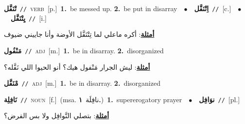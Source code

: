 \documentclass[10pt,a4paper,twoside]{article} %
\begin{document}
\begin{multicols}{2}
{\setlength\topsep{0pt}\textbf{\foreignlanguage{arabic}{تْنَفَّل}}\ {\color{gray}\texttt{//}\color{black}}\ \textsc{verb}\ [p.]\ \textbf{1.}~be messed up.  \textbf{2.}~be put in disarray\ \ $\bullet$\ \ \setlength\topsep{0pt}\textbf{\foreignlanguage{arabic}{اِتْنَفَّل}}\ {\color{gray}\texttt{//}\color{black}}\ [c.]\ \ $\bullet$\ \ \setlength\topsep{0pt}\textbf{\foreignlanguage{arabic}{يِتْنَفَّل}}\ {\color{gray}\texttt{//}\color{black}}\ [i.]\  \begin{flushright}\color{gray}\foreignlanguage{arabic}{\textbf{\underline{\foreignlanguage{arabic}{أمثلة}}}: أكره ماعلي لما تِتْنَفَّل الأوضة وأنا جاييني ضيوف}\end{flushright}\color{black}} \vspace{2mm}

{\setlength\topsep{0pt}\textbf{\foreignlanguage{arabic}{مَنْفُول}}\ {\color{gray}\texttt{//}\color{black}}\ \textsc{adj}\ [m.]\ \textbf{1.}~be in disarray.  \textbf{2.}~disorganized\  \begin{flushright}\color{gray}\foreignlanguage{arabic}{\textbf{\underline{\foreignlanguage{arabic}{أمثلة}}}: ليش الجرار مَنْفول هيك؟ أنو الحيوا اللي نَفَّله؟}\end{flushright}\color{black}} \vspace{2mm}

{\setlength\topsep{0pt}\textbf{\foreignlanguage{arabic}{مْنَفَّل}}\ {\color{gray}\texttt{//}\color{black}}\ \textsc{adj}\ [m.]\ \textbf{1.}~be in disarray.  \textbf{2.}~disorganized\ } \vspace{2mm}

{\setlength\topsep{0pt}\textbf{\foreignlanguage{arabic}{نَافِلِة}}\ {\color{gray}\texttt{//}\color{black}}\ \textsc{noun}\ [f.]\ \color{gray}(msa. \foreignlanguage{arabic}{نافِلَة}~\foreignlanguage{arabic}{\textbf{١.}})\color{black}\ \textbf{1.}~supererogatory prayer\ \ $\bullet$\ \ \setlength\topsep{0pt}\textbf{\foreignlanguage{arabic}{نوَافِل}}\ {\color{gray}\texttt{//}\color{black}}\ [pl.]\  \begin{flushright}\color{gray}\foreignlanguage{arabic}{\textbf{\underline{\foreignlanguage{arabic}{أمثلة}}}: بتصلي النَّوافِل ولا بس الفرض؟}\end{flushright}\color{black}} \vspace{2mm}


\end{multicols}
\end{document}
